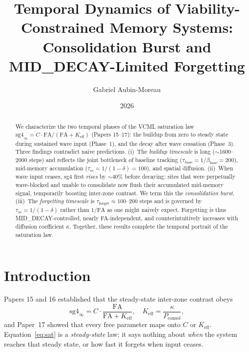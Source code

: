 \documentclass[11pt]{article}
\title{Temporal Dynamics of Viability-Constrained Memory Systems:\\
       Consolidation Burst and MID\_DECAY-Limited Forgetting}
\author{Gabriel Aubin-Moreau}
\date{2026}
\begin{document}
\maketitle

\begin{abstract}
We characterize the two temporal phases of the VCML saturation law
$\mathrm{sg4}_\infty = C \cdot \mathrm{FA} / (\mathrm{FA} + K_{\mathrm{eff}})$
(Papers 15--17): the buildup from zero to steady state during sustained wave input
(Phase~1), and the decay after wave cessation (Phase~3).
Three findings contradict naive predictions.
(i)~The \emph{buildup timescale} is long ($\sim$1600--2000 steps) and reflects
the joint bottleneck of baseline tracking ($\tau_{\mathrm{base}} = 1/\beta_{\mathrm{base}} = 200$),
mid-memory accumulation ($\tau_m = 1/(1-\delta) = 100$), and spatial diffusion.
(ii)~When wave input ceases, sg4 first \emph{rises} by $\sim$40\% before decaying:
sites that were perpetually wave-blocked and unable to consolidate
now flush their accumulated mid-memory signal, temporarily boosting inter-zone contrast.
We term this the \emph{consolidation burst}.
(iii)~The \emph{forgetting timescale} is $\tau_{\mathrm{forget}} \approx 100$--200 steps
and is governed by $\tau_m = 1/(1-\delta)$ rather than $1/\mathrm{FA}$
as one might naively expect.
Forgetting is thus MID\_DECAY-controlled, nearly FA-independent,
and counterintuitively increases with diffusion coefficient $\kappa$.
Together, these results complete the temporal portrait of the saturation law.
\end{abstract}

\section{Introduction}

Papers 15 and 16 established that the steady-state inter-zone contrast obeys
\begin{equation}
  \mathrm{sg4}_\infty = C \cdot \frac{\mathrm{FA}}{\mathrm{FA} + K_{\mathrm{eff}}},
  \quad K_{\mathrm{eff}} = \frac{\kappa}{P_{\mathrm{consol}}},
  \label{eq:sat}
\end{equation}
and Paper~17 showed that every free parameter maps onto $C$ or $K_{\mathrm{eff}}$.
Equation~\eqref{eq:sat} is a \emph{steady-state} law; it says nothing about
\emph{when} the system reaches that steady state, or how fast it forgets
when input ceases.
\end{document}
